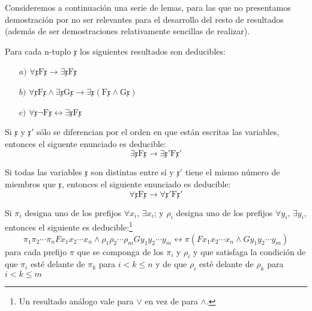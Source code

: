 Consideremos a continuación una serie de lemas, para las que no presentamos demostración por no ser relevantes para el desarrollo del resto de resultados 
(además de ser demostraciones relativamente sencillas de realizar).

\begin{lema} \label{lem:lema-1}
    Para cada n-tuplo $\mathfrak{x}$ los siguientes resultados son deducibles:
    \begin{enumerate}
        \item[$a)$] $ \forall \mathfrak{x} \text{F} \mathfrak{x} \rightarrow \exists \mathfrak{x} \text{F} \mathfrak{x}  $
        \item[$b)$] $ \forall \mathfrak{x} \text{F} \mathfrak{x} \wedge \exists \mathfrak{x} \text{G} \mathfrak{x} \rightarrow \exists \mathfrak{x} 
                    (\text{F} \mathfrak{x} \wedge \text{G} \mathfrak{x}) $
        \item[$c)$] $ \forall \mathfrak{x} \lnot \text{F} \mathfrak{x} \leftrightarrow \exists \mathfrak{x} \text{F} \mathfrak{x} $
    \end{enumerate}
\end{lema}

\begin{lema} \label{lem:lema-2}
    Si $\mathfrak{x}$ y $\mathfrak{x}'$ sólo se diferencian por el orden en que están escritas las variables, entonces el siguente enunciado es deducible:
    $$\exists \mathfrak{x} \text{F} \mathfrak{x} \rightarrow \exists \mathfrak{x}' \text{F} \mathfrak{x}'$$ 
\end{lema}

\begin{lema} \label{lem:lema-3}
    Si todas las variables $\mathfrak{x}$ son distintas entre sí y $\mathfrak{x}'$ tiene el mismo número de miembros que $\mathfrak{x}$, entonces el siguiente enunciado
    es deducible:
    $$\forall \mathfrak{x} \text{F} \mathfrak{x} \rightarrow \forall \mathfrak{x}' \text{F} \mathfrak{x}'$$
\end{lema}

\begin{lema} \label{lem:lema-4}
    Si $\pi_i$ designa uno de los prefijos $\forall x_i$, $\exists x_i$; y $\rho_i$ designa uno de los prefijos $\forall y_i$, $\exists y_i$, 
    entonces el siguiente es deducible:\footnote{Un resultado análogo vale para $\vee$ en vez de para $\wedge$.}
    $$ \pi_1 \pi_2 \cdots \pi_n Fx_1 x_2 \cdots x_n \wedge \rho_1 \rho_2 \cdots \rho_m G y_1 y_2 \cdots y_m \leftrightarrow \pi(Fx_1 x_2 \cdots x_n \wedge Gy_1 y_2 \cdots y_m ) $$
    para cada prefijo $\pi$ que se componga de los $\pi_i$ y $\rho_i$ y que satisfaga la condición de que $\pi_i$ esté delante de $\pi_k$ 
    para $i < k \leq n$ y de que $\rho_i$ esté delante de $\rho_k$ para $i < k \leq m$ 
\end{lema}

